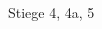 \documentclass[a4paper]{article}
\begin{document}
\printVSLEventHeader{}{}
\begin{vsltext}{3cm}{3.5cm}

    \vspace{3cm}

    \Stair{2cm} Stiege 4, 4a, 5


\end{vsltext}
\end{document}
